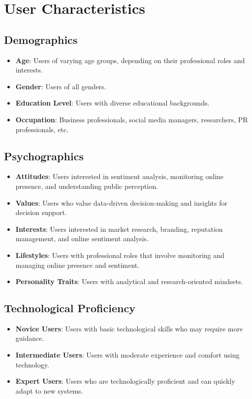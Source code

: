 \documentclass[12pt]{article}
\begin{document}
\section{User Characteristics}

\subsection{Demographics}
\begin{itemize}
  \item \textbf{Age}: Users of varying age groups, depending on their professional roles and interests.
  \item \textbf{Gender}: Users of all genders.
  \item \textbf{Education Level}: Users with diverse educational backgrounds.
  \item \textbf{Occupation}: Business professionals, social media managers, researchers, PR professionals, etc.
\end{itemize}

\subsection{Psychographics}
\begin{itemize}
  \item \textbf{Attitudes}: Users interested in sentiment analysis, monitoring online presence, and understanding public perception.
  \item \textbf{Values}: Users who value data-driven decision-making and insights for decision support.
  \item \textbf{Interests}: Users interested in market research, branding, reputation management, and online sentiment analysis.
  \item \textbf{Lifestyles}: Users with professional roles that involve monitoring and managing online presence and sentiment.
  \item \textbf{Personality Traits}: Users with analytical and research-oriented mindsets.
\end{itemize}

\subsection{Technological Proficiency}
\begin{itemize}
  \item \textbf{Novice Users}: Users with basic technological skills who may require more guidance.
  \item \textbf{Intermediate Users}: Users with moderate experience and comfort using technology.
  \item \textbf{Expert Users}: Users who are technologically proficient and can quickly adapt to new systems.
\end{itemize}
\end{document}
